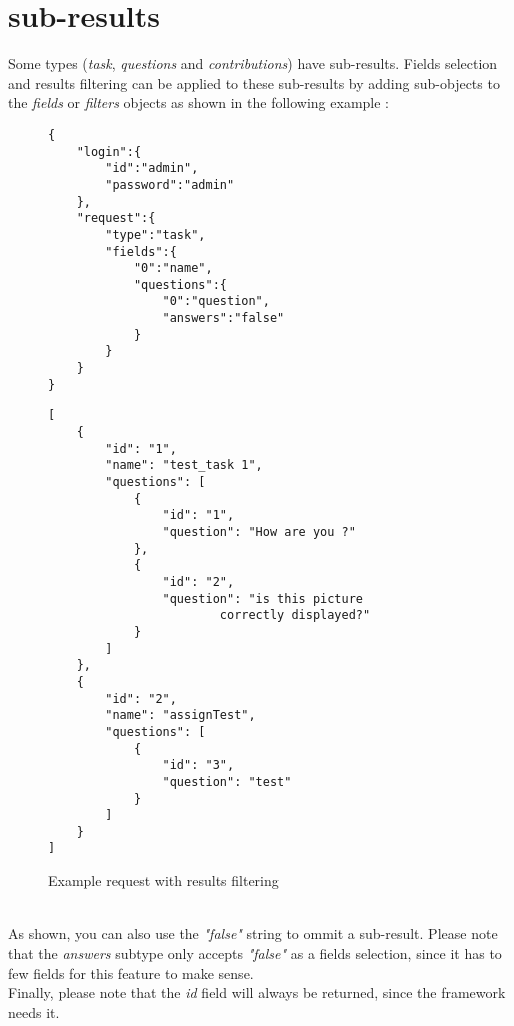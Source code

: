 \documentclass[notitlepage]{report}
\begin{document}
\section{sub-results}
Some types (\emph{task}, \emph{questions} and \emph{contributions}) have sub-results. Fields selection and results filtering can be applied to these sub-results by adding sub-objects to the \emph{fields} or \emph{filters} objects as shown in the following example :
\begin{figure}[h]
\centering
\begin{minipage}{.45\linewidth}
\begin{verbatim}
{
	"login":{	
		"id":"admin",
		"password":"admin"
	},
	"request":{
		"type":"task",
		"fields":{
			"0":"name",
			"questions":{
				"0":"question",
				"answers":"false"
			}
		}
	}
}
\end{verbatim}
\end{minipage}
\begin{minipage}{.45\linewidth}
\begin{verbatim}
[
    {
        "id": "1",
        "name": "test_task 1",
        "questions": [
            {
                "id": "1",
                "question": "How are you ?"
            },
            {
                "id": "2",
                "question": "is this picture 
                		correctly displayed?"
            }
        ]
    },
    {
        "id": "2",
        "name": "assignTest",
        "questions": [
            {
                "id": "3",
                "question": "test"
            }
        ]
    }
]
\end{verbatim}
\end{minipage}
\caption{Example request with results filtering}
\end{figure}
\\As shown, you can also use the \emph{"false"} string to ommit a sub-result. Please note that the \emph{answers} subtype only accepts \emph{"false"} as a fields selection, since it has to few fields for this feature to make sense. \\
Finally, please note that the \emph{id} field will always be returned, since the framework needs it.
\end{document}
